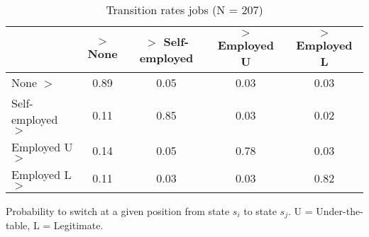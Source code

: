 \begin{table}[htp]
\footnotesize
\setlength{\tabcolsep}{10pt}
\renewcommand{\arraystretch}{1.3}
\begin{threeparttable}
\centering
\caption{Transition rates jobs (N = 207)} 
\label{tab:transition_rates_jobs}
\begin{tabular}{lcccc}
  \hline
 & $>$ None & $>$ Self-employed & $>$ Employed U & $>$ Employed L \\ 
  \hline
None $>$ & 0.89 & 0.05 & 0.03 & 0.03 \\ 
  Self-employed $>$ & 0.11 & 0.85 & 0.03 & 0.02 \\ 
  Employed U $>$ & 0.14 & 0.05 & 0.78 & 0.03 \\ 
  Employed L $>$ & 0.11 & 0.03 & 0.03 & 0.82 \\ 
   \hline
\end{tabular}
\begin{tablenotes}
\scriptsize
\item Probability to switch at a given position from state $s_i$ to state $s_j$. U = Under-the-table, L = Legitimate.
\end{tablenotes}
\end{threeparttable}
\end{table}
